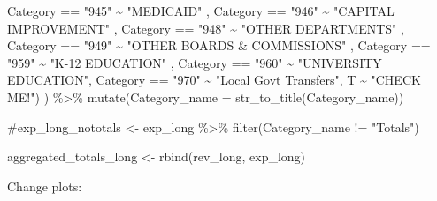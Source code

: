 \documentclass[
  letterpaper,
  DIV=11,
  numbers=noendperiod]{scrreport}
\newenvironment{Shaded}{\begin{snugshade}}{\end{snugshade}}
\newcommand{\AttributeTok}[1]{\textcolor[rgb]{0.40,0.45,0.13}{#1}}
\newcommand{\CommentTok}[1]{\textcolor[rgb]{0.37,0.37,0.37}{#1}}
\newcommand{\FunctionTok}[1]{\textcolor[rgb]{0.28,0.35,0.67}{#1}}
\newcommand{\NormalTok}[1]{\textcolor[rgb]{0.00,0.23,0.31}{#1}}
\newcommand{\OtherTok}[1]{\textcolor[rgb]{0.00,0.23,0.31}{#1}}
\newcommand{\SpecialCharTok}[1]{\textcolor[rgb]{0.37,0.37,0.37}{#1}}
\newcommand{\StringTok}[1]{\textcolor[rgb]{0.13,0.47,0.30}{#1}}
\begin{document}
\begin{Shaded}
\begin{Highlighting}[]
\NormalTok{             Category }\SpecialCharTok{==} \StringTok{"945"} \SpecialCharTok{\textasciitilde{}} \StringTok{"MEDICAID"}\NormalTok{ ,}
\NormalTok{             Category }\SpecialCharTok{==} \StringTok{"946"} \SpecialCharTok{\textasciitilde{}} \StringTok{"CAPITAL IMPROVEMENT"}\NormalTok{ , }
\NormalTok{             Category }\SpecialCharTok{==} \StringTok{"948"} \SpecialCharTok{\textasciitilde{}} \StringTok{"OTHER DEPARTMENTS"}\NormalTok{ ,}
\NormalTok{             Category }\SpecialCharTok{==} \StringTok{"949"} \SpecialCharTok{\textasciitilde{}} \StringTok{"OTHER BOARDS \& COMMISSIONS"}\NormalTok{ ,}
\NormalTok{             Category }\SpecialCharTok{==} \StringTok{"959"} \SpecialCharTok{\textasciitilde{}} \StringTok{"K{-}12 EDUCATION"}\NormalTok{ ,}
\NormalTok{             Category }\SpecialCharTok{==} \StringTok{"960"} \SpecialCharTok{\textasciitilde{}} \StringTok{"UNIVERSITY EDUCATION"}\NormalTok{,}
\NormalTok{             Category }\SpecialCharTok{==} \StringTok{"970"} \SpecialCharTok{\textasciitilde{}} \StringTok{"Local Govt Transfers"}\NormalTok{,}
\NormalTok{             T }\SpecialCharTok{\textasciitilde{}} \StringTok{"CHECK ME!"}\NormalTok{)}
\NormalTok{           ) }\SpecialCharTok{\%\textgreater{}\%} 
  \FunctionTok{mutate}\NormalTok{(}\AttributeTok{Category\_name =} \FunctionTok{str\_to\_title}\NormalTok{(Category\_name))}


\CommentTok{\#exp\_long\_nototals \textless{}{-} exp\_long \%\textgreater{}\% filter(Category\_name != "Totals")}


\NormalTok{aggregated\_totals\_long }\OtherTok{\textless{}{-}} \FunctionTok{rbind}\NormalTok{(rev\_long, exp\_long) }
\end{Highlighting}
\end{Shaded}

Change plots:
\end{document}
